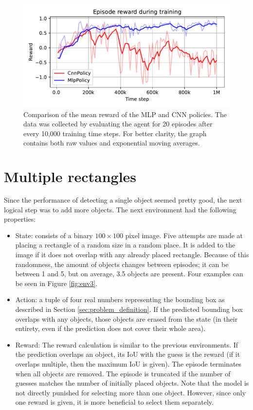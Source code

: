 \documentclass[
  digital,     %
  oneside,     %
  nosansbold,  %
  nocolorbold, %
  lof,         %
  lot,         %
]{fithesis4}
\begin{document}
\begin{figure}
    \includegraphics[width=1\linewidth]{graphs/v2_mpl_cnn.pdf}
    \caption{Comparison of the mean reward of the MLP and CNN policies. The data was collected by evaluating the agent for 20 episodes after every 10,000 training time steps. For better clarity, the graph contains both raw values and exponential moving averages.}
    \label{fig:v2_mlp_cnn}
\end{figure}

\section{Multiple rectangles}
\label{sec:multi-rect}
Since the performance of detecting a single object seemed pretty good, the next logical step was to add more objects. The next environment had the following properties:
\begin{itemize}
    \item State: consists of a binary $100\times100$ pixel image. Five attempts are made at placing a rectangle of a random size in a random place. It is added to the image if it does not overlap with any already placed rectangle. Because of this randomness, the amount of objects changes between episodes; it can be between 1 and 5, but on average, 3.5 objects are present. Four examples can be seen in Figure \ref{fig:env3}.
    \item Action: a tuple of four real numbers representing the bounding box as described in Section \ref{sec:problem_definition}. If the predicted bounding box overlaps with any objects, those objects are erased from the state (in their entirety, even if the prediction does not cover their whole area).
    \item Reward: The reward calculation is similar to the previous environments. If the prediction overlaps an object, its IoU with the guess is the reward (if it overlaps multiple, then the maximum IoU is given). The episode terminates when all objects are removed. The episode is truncated if the number of guesses matches the number of initially placed objects. Note that the model is not directly punished for selecting more than one object. However, since only one reward is given, it is more beneficial to select them separately.
\end{itemize}
\end{document}
